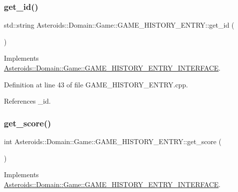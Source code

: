 \subsubsection{\texorpdfstring{get\+\_\+id()}{get\_id()}}
{\footnotesize\ttfamily std\+::string Asteroids\+::\+Domain\+::\+Game\+::\+G\+A\+M\+E\+\_\+\+H\+I\+S\+T\+O\+R\+Y\+\_\+\+E\+N\+T\+R\+Y\+::get\+\_\+id (\begin{DoxyParamCaption}{ }\end{DoxyParamCaption})\hspace{0.3cm}{\ttfamily [virtual]}}



Implements \hyperlink{classAsteroids_1_1Domain_1_1Game_1_1GAME__HISTORY__ENTRY__INTERFACE_a39807f3775541e1db7f138769242b72b}{Asteroids\+::\+Domain\+::\+Game\+::\+G\+A\+M\+E\+\_\+\+H\+I\+S\+T\+O\+R\+Y\+\_\+\+E\+N\+T\+R\+Y\+\_\+\+I\+N\+T\+E\+R\+F\+A\+CE}.



Definition at line 43 of file G\+A\+M\+E\+\_\+\+H\+I\+S\+T\+O\+R\+Y\+\_\+\+E\+N\+T\+R\+Y.\+cpp.



References \+\_\+id.

\mbox{\label{classAsteroids_1_1Domain_1_1Game_1_1GAME__HISTORY__ENTRY_a552223ab147d6dd6bad0f2f844cc9000}} 
\subsubsection{\texorpdfstring{get\+\_\+score()}{get\_score()}}
{\footnotesize\ttfamily int Asteroids\+::\+Domain\+::\+Game\+::\+G\+A\+M\+E\+\_\+\+H\+I\+S\+T\+O\+R\+Y\+\_\+\+E\+N\+T\+R\+Y\+::get\+\_\+score (\begin{DoxyParamCaption}{ }\end{DoxyParamCaption})\hspace{0.3cm}{\ttfamily [virtual]}}



Implements \hyperlink{classAsteroids_1_1Domain_1_1Game_1_1GAME__HISTORY__ENTRY__INTERFACE_aca7ed35dd716a6621d9faf44822339ae}{Asteroids\+::\+Domain\+::\+Game\+::\+G\+A\+M\+E\+\_\+\+H\+I\+S\+T\+O\+R\+Y\+\_\+\+E\+N\+T\+R\+Y\+\_\+\+I\+N\+T\+E\+R\+F\+A\+CE}.



